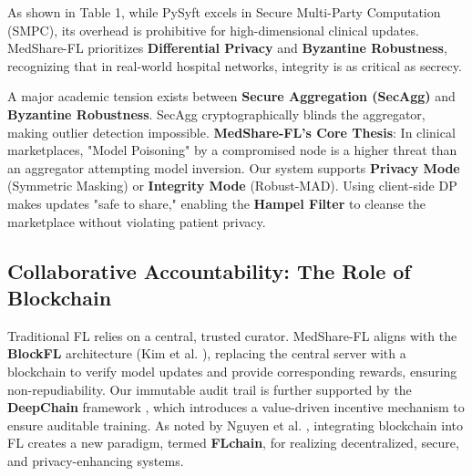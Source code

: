\documentclass[10pt, a4paper, twocolumn]{article}
\begin{document}
\begin{table}[hbt!]
\centering
{}
\caption{Framework Comparison showing MedShare-FL's focus on clinical integrity.}
\end{table}

As shown in Table 1, while PySyft excels in Secure Multi-Party Computation (SMPC), its overhead is prohibitive for high-dimensional clinical updates. MedShare-FL prioritizes \textbf{Differential Privacy} and \textbf{Byzantine Robustness}, recognizing that in real-world hospital networks, integrity is as critical as secrecy.

A major academic tension exists between \textbf{Secure Aggregation (SecAgg)} \cite{bonawitz2017} and \textbf{Byzantine Robustness}. SecAgg cryptographically blinds the aggregator, making outlier detection impossible. \textbf{MedShare-FL’s Core Thesis}: In clinical marketplaces, "Model Poisoning" by a compromised node is a higher threat than an aggregator attempting model inversion. Our system supports \textbf{Privacy Mode} (Symmetric Masking) or \textbf{Integrity Mode} (Robust-MAD). Using client-side DP makes updates "safe to share," enabling the \textbf{Hampel Filter} \cite{hampel1974} to cleanse the marketplace without violating patient privacy.

\subsection{Collaborative Accountability: The Role of Blockchain}
Traditional FL relies on a central, trusted curator. MedShare-FL aligns with the \textbf{BlockFL} architecture (Kim et al. \cite{kim2020}), replacing the central server with a blockchain to verify model updates and provide corresponding rewards, ensuring non-repudiability. Our immutable audit trail is further supported by the \textbf{DeepChain} framework \cite{weng2021}, which introduces a value-driven incentive mechanism to ensure auditable training. As noted by Nguyen et al. \cite{nguyen2021}, integrating blockchain into FL creates a new paradigm, termed \textbf{FLchain}, for realizing decentralized, secure, and privacy-enhancing systems.
\end{document}
